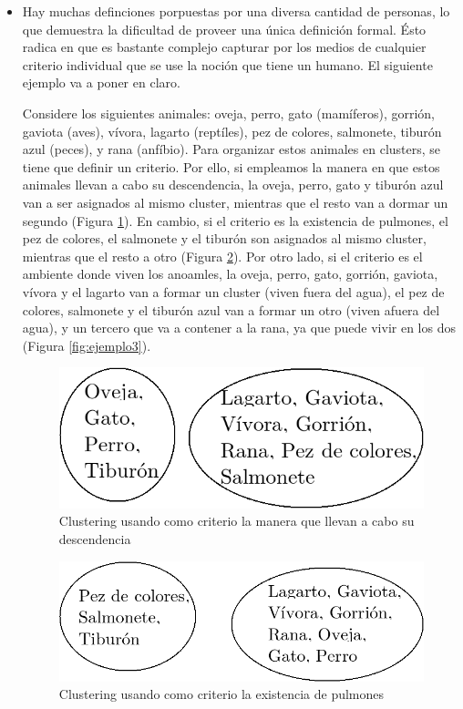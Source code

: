 \begin{itemize}

\item Hay muchas definciones porpuestas por una diversa cantidad de personas,
 lo que demuestra la dificultad de proveer una \'unica definici\'on formal. Ésto radica en que
es bastante complejo capturar por los medios de cualquier criterio individual que se 
use la noci\'on que tiene un humano. El siguiente ejemplo va a poner en claro.

Considere los siguientes animales: oveja, perro, gato (mam\'iferos), gorri\'on, gaviota (aves),
v\'ivora, lagarto (rept\'iles), pez de colores, salmonete, tibur\'on azul (peces), y rana (anf\'ibio).
Para organizar estos animales en clusters, se tiene que definir un criterio. Por ello, si 
empleamos la manera en que estos animales llevan a cabo su descendencia, la oveja, perro, gato
y tibur\'on azul van a ser asignados al mismo cluster, mientras que el resto van a dormar un segundo
(Figura \ref{fig:ejemplo1}).  En cambio, si el criterio es la existencia de pulmones, 
el pez de colores, el salmonete y el tibur\'on son
asignados al mismo cluster, mientras que el resto a otro (Figura \ref{fig:ejemplo2}).
 Por otro lado, si el criterio es el ambiente
donde viven los anoamles, la oveja, perro, gato, gorri\'on, gaviota, v\'ivora y el lagarto van a formar un cluster
(viven fuera del agua), el pez de colores, salmonete y el tibur\'on azul van a formar un otro (viven afuera
del agua), y un tercero que va a contener a la rana, ya que puede vivir en los dos (Figura \ref{fig:ejemplo3}). 

\begin{figure}[htb]
\centering
\includegraphics[scale=0.35,type=png,ext=.png,read=.png]{figures/ejemplo1}
\caption{Clustering usando como criterio la manera que llevan a cabo su descendencia}
\label{fig:ejemplo1}
\end{figure}

\begin{figure}[htb]
\centering
\includegraphics[scale=0.35,type=png,ext=.png,read=.png]{figures/ejemplo2}
\caption{Clustering usando como criterio la existencia de pulmones}
\label{fig:ejemplo2}
\end{figure}


\end{itemize}
